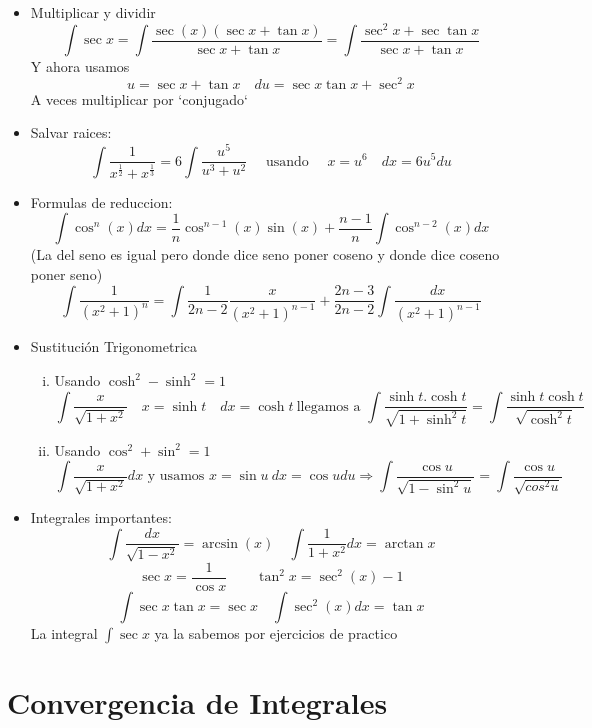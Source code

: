 \documentclass{article}
\theoremstyle{break}
\begin{document}
\begin{itemize}
		\item Multiplicar y dividir
				\[\int \sec x = \int \frac{\sec (x) (\sec x + \tan x)}{\sec x+\tan x} = \int\frac{\sec^2 x+ \sec\tan x}{\sec x + \tan x }\]
				Y ahora usamos 
				\[u= \sec x + \tan x \quad du=\sec x \tan x + \sec^2x\]
				A veces multiplicar por `conjugado`

		\item Salvar raices:
				\[\int \frac{1}{x^{\frac{1}{2}}+ x^{\frac{1}{3}}} = 6\int \frac{u^5}{u^3+u^2} \quad \text{ usando }\quad x = u^6 \quad dx = 6u^5du\]
		
		\item Formulas de reduccion:
				\[\int \cos^n(x) dx = \frac{1}{n}\cos^{n-1}(x)\sin(x) + \frac{n-1}{n}\int\cos^{n-2}(x)dx\] 
				(La del seno es igual pero donde dice seno poner coseno y donde dice coseno poner seno)
				\[\int\frac{1}{(x^2+1)^n}= \int\frac{1}{2n-2}\frac{x}{(x^2+1)^{n-1}} +\frac{2n-3}{2n-2} \int\frac{dx}{(x^2+1)^{n-1}}\]
	
		\item Sustitución Trigonometrica
			\begin{enumerate}[(i)]
						\item Usando $\cosh^2 -\sinh^2 = 1$
								\[\int\frac{x}{\sqrt{1+x^2}}\quad x=\sinh t \quad dx=\cosh t \ \text{llegamos a } 
								\int \frac{\sinh t.\cosh t}{\sqrt{1+\sinh^2 t}} = \int\frac{\sinh t \cosh t}{\sqrt{\cosh^2 t}}\] 
						\item Usando $\cos^2+\sin^2=1$
								\[\int\frac{x}{\sqrt{1+x^2}}dx \text{ y usamos } x=\sin u \ dx=\cos u du \Longrightarrow 
						\int\frac{\cos u}{\sqrt{1-\sin^2u}} = \int\frac{\cos u}{\sqrt{cos^2u}} \]
				\end{enumerate}
		\item Integrales importantes:
				\[\int \frac{dx}{\sqrt{1-x^2}}= \arcsin (x) \quad \int \frac{1}{1+x^2}dx = \arctan x\]
				\[\sec x= \frac{1}{\cos x} \quad \quad \tan^2x = \sec^2(x) -1\]
				\[\int \sec x \tan x = \sec x \quad \int\sec^2(x)dx = \tan x\]
				La integral $\int \sec x$ ya la sabemos por ejercicios de practico
    \end{itemize}

	\section{Convergencia de Integrales}
\end{document}
